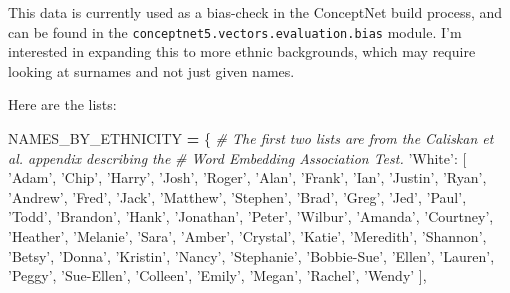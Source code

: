 \documentclass[]{book}
\newenvironment{Shaded}{\begin{snugshade}}{\end{snugshade}}
\newcommand{\StringTok}[1]{\textcolor[rgb]{0.31,0.60,0.02}{#1}}
\newcommand{\CommentTok}[1]{\textcolor[rgb]{0.56,0.35,0.01}{\textit{#1}}}
\newcommand{\OperatorTok}[1]{\textcolor[rgb]{0.81,0.36,0.00}{\textbf{#1}}}
\newcommand{\NormalTok}[1]{#1}
\theoremstyle{definition}
\theoremstyle{definition}
\theoremstyle{definition}
\theoremstyle{remark}
\begin{document}
This data is currently used as a bias-check in the ConceptNet build
process, and can be found in the
\texttt{conceptnet5.vectors.evaluation.bias} module. I'm interested in
expanding this to more ethnic backgrounds, which may require looking at
surnames and not just given names.

Here are the lists:

\begin{Shaded}
\begin{Highlighting}[]
\NormalTok{NAMES_BY_ETHNICITY }\OperatorTok{=}\NormalTok{ \{}
    \CommentTok{# The first two lists are from the Caliskan et al. appendix describing the}
    \CommentTok{# Word Embedding Association Test.}
    \StringTok{'White'}\NormalTok{: [}
        \StringTok{'Adam'}\NormalTok{, }\StringTok{'Chip'}\NormalTok{, }\StringTok{'Harry'}\NormalTok{, }\StringTok{'Josh'}\NormalTok{, }\StringTok{'Roger'}\NormalTok{, }\StringTok{'Alan'}\NormalTok{, }\StringTok{'Frank'}\NormalTok{, }\StringTok{'Ian'}\NormalTok{, }\StringTok{'Justin'}\NormalTok{,}
        \StringTok{'Ryan'}\NormalTok{, }\StringTok{'Andrew'}\NormalTok{, }\StringTok{'Fred'}\NormalTok{, }\StringTok{'Jack'}\NormalTok{, }\StringTok{'Matthew'}\NormalTok{, }\StringTok{'Stephen'}\NormalTok{, }\StringTok{'Brad'}\NormalTok{, }\StringTok{'Greg'}\NormalTok{, }\StringTok{'Jed'}\NormalTok{,}
        \StringTok{'Paul'}\NormalTok{, }\StringTok{'Todd'}\NormalTok{, }\StringTok{'Brandon'}\NormalTok{, }\StringTok{'Hank'}\NormalTok{, }\StringTok{'Jonathan'}\NormalTok{, }\StringTok{'Peter'}\NormalTok{, }\StringTok{'Wilbur'}\NormalTok{, }\StringTok{'Amanda'}\NormalTok{,}
        \StringTok{'Courtney'}\NormalTok{, }\StringTok{'Heather'}\NormalTok{, }\StringTok{'Melanie'}\NormalTok{, }\StringTok{'Sara'}\NormalTok{, }\StringTok{'Amber'}\NormalTok{, }\StringTok{'Crystal'}\NormalTok{, }\StringTok{'Katie'}\NormalTok{,}
        \StringTok{'Meredith'}\NormalTok{, }\StringTok{'Shannon'}\NormalTok{, }\StringTok{'Betsy'}\NormalTok{, }\StringTok{'Donna'}\NormalTok{, }\StringTok{'Kristin'}\NormalTok{, }\StringTok{'Nancy'}\NormalTok{, }\StringTok{'Stephanie'}\NormalTok{,}
        \StringTok{'Bobbie-Sue'}\NormalTok{, }\StringTok{'Ellen'}\NormalTok{, }\StringTok{'Lauren'}\NormalTok{, }\StringTok{'Peggy'}\NormalTok{, }\StringTok{'Sue-Ellen'}\NormalTok{, }\StringTok{'Colleen'}\NormalTok{, }\StringTok{'Emily'}\NormalTok{,}
        \StringTok{'Megan'}\NormalTok{, }\StringTok{'Rachel'}\NormalTok{, }\StringTok{'Wendy'}
\NormalTok{    ],}


\end{Highlighting}
\end{Shaded}
\end{document}
